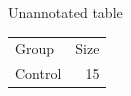 \documentclass[table-policy=strict]{beamer-accessibility}
\begin{document}
\begin{frame}{Unannotated table}
\begin{tabular}{lr}Group & Size\\Control & 15\end{tabular}
\end{frame}
\end{document}
